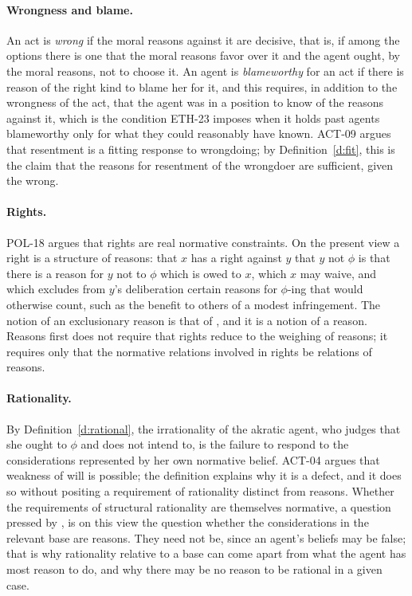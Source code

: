 \documentclass{situationist-preprint}
\begin{document}
\paragraph{Wrongness and blame.} An act is \emph{wrong} if the moral reasons against it are decisive, that is, if among the options there is one that the moral reasons favor over it and the agent ought, by the moral reasons, not to choose it. An agent is \emph{blameworthy} for an act if there is reason of the right kind to blame her for it, and this requires, in addition to the wrongness of the act, that the agent was in a position to know of the reasons against it, which is the condition ETH-23 imposes when it holds past agents blameworthy only for what they could reasonably have known. ACT-09 argues that resentment is a fitting response to wrongdoing; by Definition~\ref{d:fit}, this is the claim that the reasons for resentment of the wrongdoer are sufficient, given the wrong.

\paragraph{Rights.} POL-18 argues that rights are real normative constraints. On the present view a right is a structure of reasons: that $x$ has a right against $y$ that $y$ not $\phi$ is that there is a reason for $y$ not to $\phi$ which is owed to $x$, which $x$ may waive, and which excludes from $y$'s deliberation certain reasons for $\phi$-ing that would otherwise count, such as the benefit to others of a modest infringement. The notion of an exclusionary reason is that of \citet{Raz1999}, and it is a notion of a reason. Reasons first does not require that rights reduce to the weighing of reasons; it requires only that the normative relations involved in rights be relations of reasons.

\paragraph{Rationality.} By Definition~\ref{d:rational}, the irrationality of the akratic agent, who judges that she ought to $\phi$ and does not intend to, is the failure to respond to the considerations represented by her own normative belief. ACT-04 argues that weakness of will is possible; the definition explains why it is a defect, and it does so without positing a requirement of rationality distinct from reasons. Whether the requirements of structural rationality are themselves normative, a question pressed by \citet{Kiesewetter2017}, is on this view the question whether the considerations in the relevant base are reasons. They need not be, since an agent's beliefs may be false; that is why rationality relative to a base can come apart from what the agent has most reason to do, and why there may be no reason to be rational in a given case.
\end{document}
